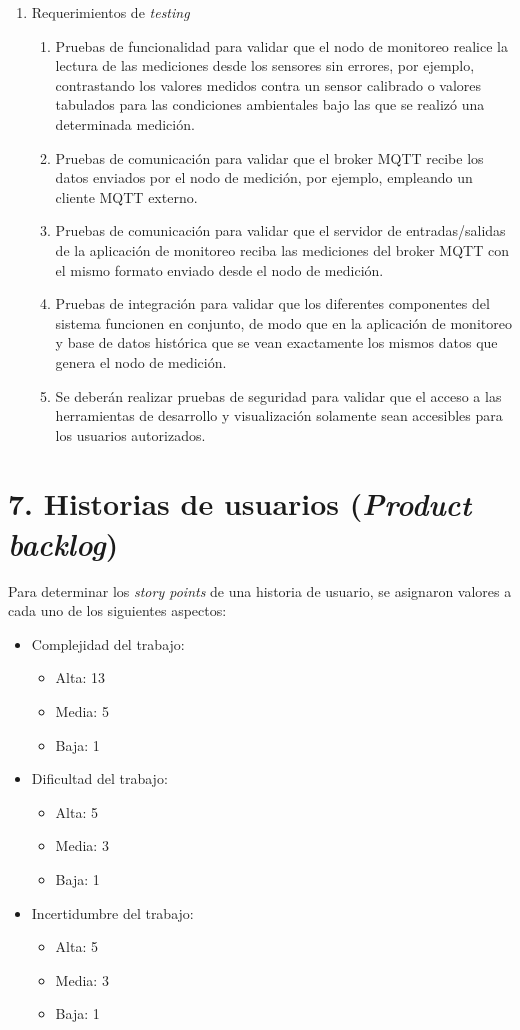 \documentclass[
11pt, %
]{charter}
\begin{document}
\begin{enumerate}
\begin{enumerate}
		\end{enumerate}	
	\item Requerimientos de \textit{testing}
		\begin{enumerate}
			\item Pruebas de funcionalidad para validar que el nodo de monitoreo realice la lectura de las mediciones desde los sensores sin errores, por ejemplo, contrastando los valores medidos contra un sensor calibrado o valores tabulados para las condiciones ambientales bajo las que se realizó una determinada medición.
 			\item Pruebas de comunicación para validar que el broker MQTT recibe los datos enviados por el nodo de medición, por ejemplo, empleando un cliente MQTT externo.
 			\item Pruebas de comunicación para validar que el servidor de entradas/salidas de la aplicación de monitoreo reciba las mediciones del broker MQTT con el mismo formato enviado desde el nodo de medición.
			\item Pruebas de integración para validar que los diferentes componentes del sistema funcionen en conjunto, de modo que en la aplicación de monitoreo y base de datos histórica que se vean exactamente los mismos datos que genera el nodo de medición.
			\item Se deberán realizar pruebas de seguridad para validar que el acceso a las herramientas de desarrollo y visualización solamente sean accesibles para los usuarios autorizados.
		\end{enumerate}	
\end{enumerate}

\section{7. Historias de usuarios (\textit{Product backlog})}
\label{sec:backlog}
Para determinar los \textit{story points} de una historia de usuario, se asignaron valores a cada uno de los siguientes aspectos:
\begin{itemize}
\item Complejidad del trabajo:
	\begin{itemize}
	\item Alta: 13
	\item Media: 5
	\item Baja: 1
	\end{itemize}
\item Dificultad del trabajo:
	\begin{itemize}
	\item Alta: 5
	\item Media: 3
	\item Baja: 1
	\end{itemize}
\item Incertidumbre del trabajo:
	\begin{itemize}
	\item Alta: 5
	\item Media: 3
	\item Baja: 1
	\end{itemize}
\end{itemize}
\end{document}
